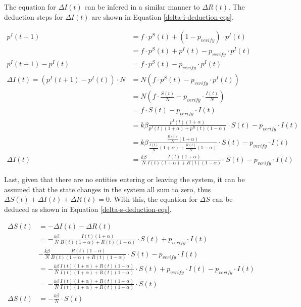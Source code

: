 The equation for $\Delta I(t)$ can be infered in a similar manner to $\Delta R(t)$.
The deduction steps for $\Delta I(t)$ are shown in Equation 
\ref{delta-i-deduction-eqs}.

\begin{align}
    p^I(t+1) &= f \cdot p^S(t) + (1 - p_{verify})\cdot p^I(t) \nonumber\\
     &= f \cdot p^S(t) + p^I(t) - p_{verify}\cdot p^I(t) \nonumber\\
    p^I(t+1) - p^I(t) &= f \cdot p^S(t) - p_{verify}\cdot p^I(t) \nonumber\\
    \Delta I(t) = (p^I(t+1) - p^I(t)) \cdot N 
    &= N (f \cdot p^S(t) - p_{verify}\cdot p^I(t)) \nonumber\\
    &= N (f \cdot \frac{S(t)}{N}  - p_{verify}\cdot \frac{I(t)}{N}) \nonumber\\
    &= f \cdot S(t) - p_{verify}\cdot I(t) \nonumber\\
    &=  k\beta \frac{p^I(t)(1+\alpha)}{p^I(t)(1+\alpha)+p^R(t)(1-\alpha)}
     \cdot S(t) - p_{verify}\cdot I(t) \nonumber\\
    &=  k\beta \frac{\frac{B(t)}{N}(1+\alpha)}{\frac{I(t)}{N}(1+\alpha)+\frac{R(t)}{N}(1-\alpha)}
     \cdot S(t) - p_{verify}\cdot I(t) \nonumber\\
     \Delta I(t) &=  \frac{k\beta}{N} \frac{I(t)(1+\alpha)}{I(t)(1+\alpha)+R(t)(1-\alpha)}
     \cdot S(t) - p_{verify}\cdot I(t) \label{delta-i-deduction-eqs}
\end{align}

Last, given that there are no entities entering or leaving the system,
it can be assumed that the state changes in the system all sum to zero,
thus $\Delta S(t)+ \Delta I(t)+ \Delta R(t) = 0$. With this, the equation for
$\Delta S$ can be deduced as shown in Equation \ref{delta-s-deduction-eqs}.

\begin{align}
    \Delta S(t) &= - \Delta I(t) - \Delta R(t) \nonumber\\
     &= -\frac{k\beta}{N} \frac{I(t)(1+\alpha)}{B(t)(1+\alpha)+R(t)(1-\alpha)}
     \cdot S(t) + p_{verify}\cdot I(t) \nonumber\\
      & -\frac{k\beta}{N} \frac{R(t)(1-\alpha)}{B(t)(1+\alpha)+R(t)(1-\alpha)} 
      \cdot S(t) - p_{verify}\cdot I(t) \nonumber\\
      &= -\frac{k\beta}{N} \frac{I(t)(1+\alpha) + R(t)(1-\alpha)}{I(t)(1+\alpha)+R(t)(1-\alpha)}
      \cdot S(t) + p_{verify}\cdot I(t) - p_{verify}\cdot I(t) \nonumber\\
      &= -\frac{k\beta}{N} \frac{I(t)(1+\alpha) + R(t)(1-\alpha)}{I(t)(1+\alpha)+R(t)(1-\alpha)}
      \cdot S(t) \nonumber\\
      \Delta S(t) &= -\frac{k\beta}{N} \cdot S(t) \label{delta-s-deduction-eqs}
\end{align}


